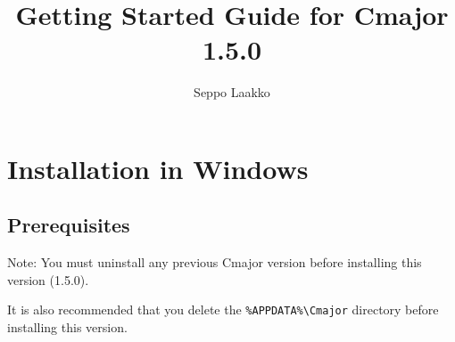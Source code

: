 \documentclass[oneside, a4paper, 11pt]{article}
\begin{document}
\title{Getting Started Guide for Cmajor 1.5.0}
\author{Seppo Laakko}
\maketitle

\section{Installation in Windows}

\subsection{Prerequisites}

Note:
You must uninstall any previous Cmajor version before installing
this version (1.5.0).

It is also recommended that you delete the
\verb|%APPDATA%\Cmajor| directory before installing
this version.
\end{document}
